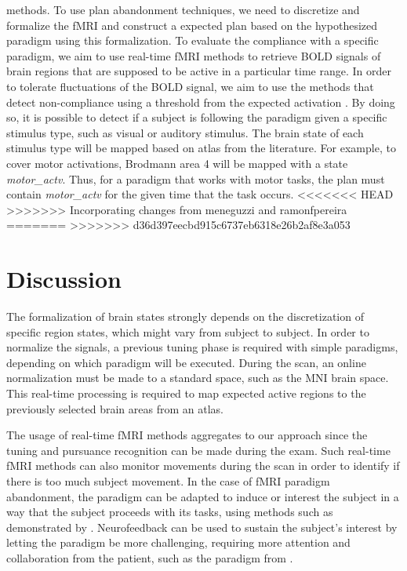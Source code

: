 \documentclass[twocolumn]{bmcart}%
\begin{document}
methods. To use plan abandonment techniques, we need to discretize and
formalize the fMRI and construct a expected plan based on the
hypothesized paradigm using this formalization. To evaluate the
compliance with a specific paradigm, we aim to use real-time fMRI
methods to retrieve BOLD signals of brain regions that are supposed to
be active in a particular time range. In order to tolerate fluctuations
of the BOLD signal, we aim to use the methods that detect non-compliance
using a threshold from the expected activation
\cite[Chap 4]{Sukthankar2014}. By doing so, it is possible to detect if
a subject is following the paradigm given a specific stimulus type, such
as visual or auditory stimulus. The brain state of each stimulus type
will be mapped based on atlas from the literature. For example, to cover
motor activations, Brodmann area 4 will be mapped with a state
\emph{motor\_actv}. Thus, for a paradigm that works with motor tasks,
the plan must contain \emph{motor\_actv} for the given time that the
task occurs.
<<<<<<< HEAD
>>>>>>> Incorporating changes from meneguzzi and ramonfpereira
=======
>>>>>>> d36d397eecbd915c6737eb6318e26b2af8e3a053

\section{Discussion}\label{discussion}

The formalization of brain states strongly depends on the discretization
of specific region states, which might vary from subject to subject. In
order to normalize the signals, a previous tuning phase is required with
simple paradigms, depending on which paradigm will be executed. During
the scan, an online normalization must be made to a standard space, such
as the MNI brain space. This real-time processing is required to map
expected active regions to the previously selected brain areas from an
atlas.

The usage of real-time fMRI methods aggregates to our approach since the
tuning and pursuance recognition can be made during the exam. Such
real-time fMRI methods can also monitor movements during the scan in
order to identify if there is too much subject movement. In the case of
fMRI paradigm abandonment, the paradigm can be adapted to induce or
interest the subject in a way that the subject proceeds with its tasks,
using methods such as demonstrated by \cite{Dongha2011}. Neurofeedback
can be used to sustain the subject's interest by letting the paradigm be
more challenging, requiring more attention and collaboration from the
patient, such as the paradigm from \cite{deBettencourt2015}.
\end{document}
